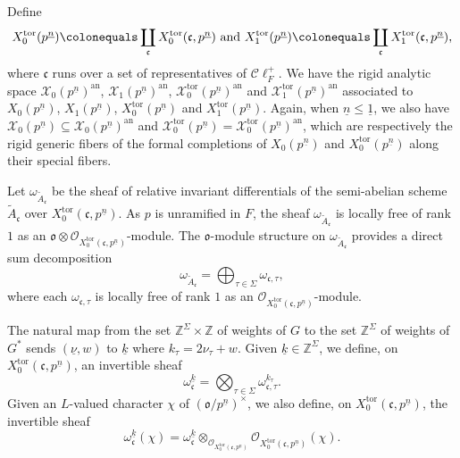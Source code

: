 \documentclass[11pt]{amsart}
\theoremstyle{definition} %
\theoremstyle{plain} %
\theoremstyle{remark} %
\newcommand{\ZZ}{{\mathbb Z}}
\newcommand{\cO}{{\mathcal O}}
\newcommand{\cX}{{\mathcal X}}
\newcommand{\frakc}{\mathfrak c}
\newcommand{\frako}{\mathfrak o}
\newcommand{\defeq}{\colonequals} %
\newcommand{\tor}{\mathrm{tor}} %
\newcommand{\an}{\mathrm{an}}
\newcommand{\Cl}{\mathscr{C}\!\ell_F^+}
\begin{document}
Define 
\[
X_0^\tor(p^{\underline{n}}) \defeq \coprod_{\frakc} X_0^\tor(\frakc,p^{\underline{n}}) \text{ and }X_1^\tor(p^{\underline{n}}) \defeq \coprod_{\frakc} X_1^\tor(\frakc,p^{\underline{n}}),
\]
where $\frakc$ runs over  a set of representatives of $\Cl$.
We have the rigid analytic space $\cX_0(p^{\underline{n}})^\an$, $\cX_1(p^{\underline{n}})^\an$, $\cX_0^\tor(p^{\underline{n}})^\an$ and  $\cX_1^\tor(p^{\underline{n}})^\an$ associated to $X_0(p^{\underline{n}})$, $X_1(p^{\underline{n}})$, 
$X_0^\tor(p^{\underline{n}})$ and  $X_1^\tor(p^{\underline{n}})$. Again, when $\underline{n}\leqslant \underline{1}$, 
we also have $\cX_0(p^{\underline{n}})\subseteq\cX_0(p^{\underline{n}})^\an$ and $\cX_0^\tor(p^{\underline{n}}) = \cX_0^\tor(p^{\underline{n}})^\an$, which are respectively the rigid generic fibers of the formal completions of $X_0(p^{\underline{n}})$ and $X_0^\tor(p^{\underline{n}})$  along their special fibers.



Let $\omega_{\widetilde{A}_\frakc}$ be the sheaf of relative invariant differentials of the semi-abelian scheme $\widetilde{A}_\frakc$ over $X_0^\tor(\frakc,p^{\underline{n}})$.
As $p$ is unramified in $F$, the sheaf $\omega_{\widetilde{A}_\frakc}$ is locally free of rank $1$ as an $\frako\otimes \cO_{X_0^\tor(\frakc,p^{\underline{n}})}$-module.
The $\frako$-module structure on $\omega_{\widetilde{A}_\frakc}$ provides a direct sum decomposition
\[\omega_{\widetilde{A}_\frakc} = \bigoplus_{\tau \in \Sigma} \omega_{\frakc,\tau}, \]
where each $\omega_{\frakc,\tau}$ is locally free of rank $1$ as an $\cO_{X_0^\tor(\frakc,p^{\underline{n}})}$-module.


The natural map from the set $\ZZ^\Sigma\times \ZZ$ of weights of $G$ to the set $\ZZ^\Sigma$ of weights of $G^\ast$ sends $(\underline{\nu},w)$ to $\underline{k}$ where $k_\tau=2\nu_\tau+w$.
Given $\underline{k}\in \ZZ^{\Sigma}$, we define, on $X_0^\tor(\frakc,p^{\underline{n}})$, an invertible sheaf 
\[\omega_\frakc^{\underline{k}} = \bigotimes_{\tau\in \Sigma}  \omega_{\frakc,\tau}^{k_{\tau}}.\]
Given an $L$-valued character $\chi$ of $(\frako/p^{\underline{n}})^\times$, we also define, on $X_0^\tor(\frakc,p^{\underline{n}})$, the invertible sheaf
\[\omega_\frakc^{\underline{k}}(\chi) = \omega_\frakc^{\underline{k}}\otimes_{\cO_{X_0^\tor(\frakc,p^{\underline{n}})}} \cO_{X_0^\tor(\frakc,p^{\underline{n}})}(\chi).\]
\end{document}
